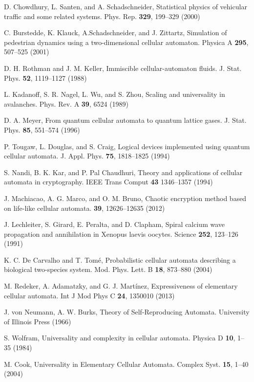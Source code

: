\begin{thebibliography}{04}

\raggedright
D. Chowdhury, L. Santen, and A. Schadschneider,
Statistical physics of vehicular traffic and some related systems.
Phys. Rep. \textbf{329}, 199--329 (2000)


\raggedright
C. Burstedde, K. Klauck, A.Schadschneider, and J. Zittartz,
Simulation of pedestrian dynamics using a two-dimensional cellular automaton. 
Physica A \textbf{295}, 507--525 (2001)


\raggedright
D. H. Rothman and J. M. Keller,
Immiscible cellular-automaton fluids.
J. Stat. Phys. \textbf{52}, 1119--1127 (1988) 


\raggedright
L. Kadanoff, S. R. Nagel, L. Wu, and S. Zhou,
Scaling and universality in avalanches.
Phys. Rev. A \textbf{39}, 6524 (1989)


\raggedright
D. A. Meyer,
From quantum cellular automata to quantum lattice gases.
J. Stat. Phys. \textbf{85}, 551--574 (1996)

\raggedright
P. Tougaw, L. Douglas, and S. Craig,
Logical devices implemented using quantum cellular automata.
J. Appl. Phys. \textbf{75}, 1818--1825 (1994)

\raggedright
S. Nandi, B. K. Kar, and P. Pal Chaudhuri,
Theory and applications of cellular automata in cryptography.
IEEE Trans Comput \textbf{43} 1346--1357 (1994)


\raggedright
J. Machiacao, A. G. Marco, and O. M. Bruno,
Chaotic encryption method based on life-like cellular automata.
\textbf{39}, 12626--12635 (2012)


\raggedright
J. Lechleiter, S. Girard, E. Peralta, and D. Clapham,
Spiral calcium wave propagation and annihilation in Xenopus laevis oocytes.
Science \textbf{252}, 123--126 (1991)


\raggedright
K. C. De Carvalho and T. Tomé,
Probabilistic cellular automata describing a biological two-species system.
Mod. Phys. Lett. B \textbf{18}, 873--880 (2004)


\raggedright
M. Redeker, A. Adamatzky, and G. J. Martínez,
Expressiveness of elementary cellular automata.
Int J Mod Phys C \textbf{24}, 1350010 (2013)


\raggedright
J. von Neumann, A. W. Burks, 
Theory of Self-Reproducing Automata. 
University of Illinois Press (1966)


\raggedright
S. Wolfram,
Universality and complexity in cellular automata.
Physica D \textbf{10}, 1--35 (1984)


\raggedright
M. Cook,
Universality in Elementary Cellular Automata.
Complex Syst. \textbf{15}, 1--40 (2004) 

\end{thebibliography}



